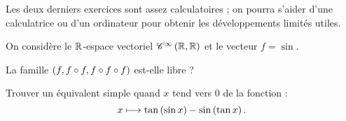 \begin{corr}
\end{corr}

\begin{rem}
Les deux derniers exercices sont assez calculatoires ; on pourra s'aider d'une calculatrice ou d'un ordinateur pour obtenir les développements limités utiles.
\end{rem}

\begin{exo}
On considère le \(\mathbb{R}\)-espace vectoriel \(\mathscr{C}^{\infty}\left(\mathbb{R},\mathbb{R}\right)\) et le vecteur \(f=\sin\).

La famille \(\left(f,f\circ f,f\circ f\circ f\right)\) est-elle libre ?
\end{exo}

\begin{corr}
\end{corr}

\begin{exo}
Trouver un équivalent simple quand \(x\) tend vers \(0\) de la fonction : \[x\longmapsto\tan\left(\sin x\right)-\sin\left(\tan x\right).\]
\end{exo}

\begin{corr}
\end{corr}